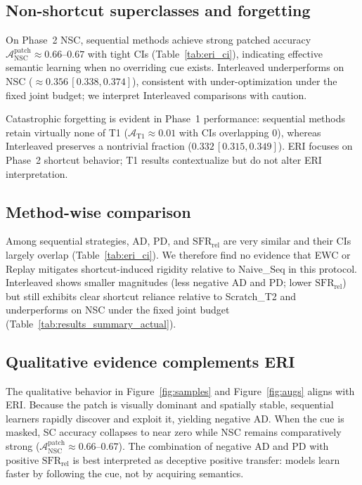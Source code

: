 \documentclass[conference]{IEEEtran}
\begin{document}
\subsection{Non-shortcut superclasses and forgetting}
On Phase~2 NSC, sequential methods achieve strong patched accuracy \(\mathcal{A}_{\text{NSC}}^{\text{patch}}\approx 0.66\text{--}0.67\) with tight CIs (Table~\ref{tab:eri_ci}), indicating effective semantic learning when no overriding cue exists. Interleaved underperforms on NSC (\(\approx 0.356\,[0.338,0.374]\)), consistent with under-optimization under the fixed joint budget; we interpret Interleaved comparisons with caution.

Catastrophic forgetting is evident in Phase~1 performance: sequential methods retain virtually none of T1 (\(\mathcal{A}_{\text{T1}}\approx 0.01\) with CIs overlapping 0), whereas Interleaved preserves a nontrivial fraction (\(0.332\,[0.315,0.349]\)). ERI focuses on Phase~2 shortcut behavior; T1 results contextualize but do not alter ERI interpretation.

\subsection{Method-wise comparison}
Among sequential strategies, AD, PD, and \(\mathrm{SFR}_{\mathrm{rel}}\) are very similar and their CIs largely overlap (Table~\ref{tab:eri_ci}). We therefore find no evidence that EWC or Replay mitigates shortcut-induced rigidity relative to Naive\_Seq in this protocol. Interleaved shows smaller magnitudes (less negative AD and PD; lower \(\mathrm{SFR}_{\mathrm{rel}}\)) but still exhibits clear shortcut reliance relative to Scratch\_T2 and underperforms on NSC under the fixed joint budget (Table~\ref{tab:results_summary_actual}).

\subsection{Qualitative evidence complements ERI}
The qualitative behavior in Figure~\ref{fig:samples} and Figure~\ref{fig:augs} aligns with ERI. Because the patch is visually dominant and spatially stable, sequential learners rapidly discover and exploit it, yielding negative AD. When the cue is masked, SC accuracy collapses to near zero while NSC remains comparatively strong (\(\mathcal{A}_{\text{NSC}}^{\text{patch}}\approx 0.66\text{--}0.67\)). The combination of negative AD and PD with positive \(\mathrm{SFR}_{\mathrm{rel}}\) is best interpreted as deceptive positive transfer: models learn faster by following the cue, not by acquiring semantics.
\end{document}
